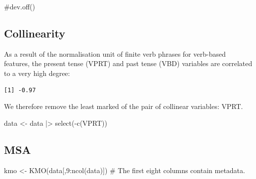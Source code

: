 \documentclass[
  letterpaper,
  DIV=11,
  numbers=noendperiod]{scrreprt}
\newenvironment{Shaded}{\begin{snugshade}}{\end{snugshade}}
\newcommand{\CommentTok}[1]{\textcolor[rgb]{0.37,0.37,0.37}{#1}}
\newcommand{\DecValTok}[1]{\textcolor[rgb]{0.68,0.00,0.00}{#1}}
\newcommand{\FunctionTok}[1]{\textcolor[rgb]{0.28,0.35,0.67}{#1}}
\newcommand{\NormalTok}[1]{\textcolor[rgb]{0.00,0.23,0.31}{#1}}
\newcommand{\OtherTok}[1]{\textcolor[rgb]{0.00,0.23,0.31}{#1}}
\newcommand{\SpecialCharTok}[1]{\textcolor[rgb]{0.37,0.37,0.37}{#1}}
\begin{document}
\begin{Shaded}
\begin{Highlighting}[]
\CommentTok{\#dev.off()}
\end{Highlighting}
\end{Shaded}

\subsection{Collinearity}\label{collinearity}

As a result of the normalisation unit of finite verb phrases for
verb-based features, the present tense (VPRT) and past tense (VBD)
variables are correlated to a very high degree:

\begin{Shaded}
\end{Shaded}

\begin{verbatim}
[1] -0.97
\end{verbatim}

We therefore remove the least marked of the pair of collinear variables:
VPRT.

\begin{Shaded}
\begin{Highlighting}[]
\NormalTok{data }\OtherTok{\textless{}{-}}\NormalTok{ data }\SpecialCharTok{|\textgreater{}} 
  \FunctionTok{select}\NormalTok{(}\SpecialCharTok{{-}}\FunctionTok{c}\NormalTok{(VPRT))}
\end{Highlighting}
\end{Shaded}

\subsection{MSA}\label{msa}

\begin{Shaded}
\begin{Highlighting}[]
\NormalTok{kmo }\OtherTok{\textless{}{-}} \FunctionTok{KMO}\NormalTok{(data[,}\DecValTok{9}\SpecialCharTok{:}\FunctionTok{ncol}\NormalTok{(data)]) }\CommentTok{\# The first eight columns contain metadata.}
\end{Highlighting}
\end{Shaded}
\end{document}
